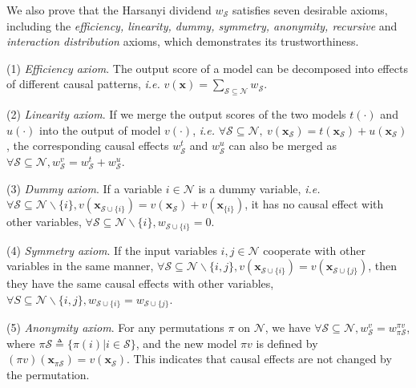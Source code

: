 We also prove that the Harsanyi dividend {\small$w_{\mathcal{S}}$} satisfies seven desirable axioms, including the \textit{efficiency, linearity, dummy, symmetry, anonymity, recursive} and \textit{interaction distribution} axioms, which demonstrates its trustworthiness.

(1) \textit{Efficiency axiom}. The output score of a model can be decomposed into effects of different causal patterns, \emph{i.e.} {\small $v(\boldsymbol{x})=\sum_{\mathcal{S}\subseteq\mathcal{N}}w_{\mathcal{S}}$}.

(2) \textit{Linearity axiom}. If we merge the output scores of the two models $t(\cdot)$ and $u(\cdot)$ into the output of model $v(\cdot)$, \emph{i.e.} {\small $\forall \mathcal{S}\subseteq\mathcal{N},~ v(\boldsymbol{x}_{\mathcal{S}})=t(\boldsymbol{x}_{\mathcal{S}})+u(\boldsymbol{x}_{\mathcal{S}})$}, the corresponding causal effects {\small $w^t_{\mathcal{S}}$} and {\small $w^u_{\mathcal{S}}$} can also be merged as {\small$\forall \mathcal{S}\subseteq \mathcal{N}, w^v_{\mathcal{S}}=w^t_{\mathcal{S}}+w^u_{\mathcal{S}}$}.

(3) \textit{Dummy axiom}. If a variable {\small $i\in\mathcal{N}$} is a dummy variable, \emph{i.e.} 
{\small $\forall \mathcal{S}\subseteq \mathcal{N}\backslash\{i\}, v(\boldsymbol{x}_{\mathcal{S}\cup\{i\}})=v(\boldsymbol{x}_{\mathcal{S}})+v(\boldsymbol{x}_{\{i\}})$}, it has no causal effect with other variables, {\small $\forall \mathcal{S}\subseteq \mathcal{N}\backslash\{i\}, w_{\mathcal{S}\cup\{i\}}=0$}.

(4) \textit{Symmetry axiom}. If the input variables {\small $i,j\in \mathcal{N}$} cooperate with other variables in the same manner, {\small $\forall \mathcal{S}\subseteq \mathcal{N}\backslash\{i,j\}, v(\boldsymbol{x}_{\mathcal{S}\cup\{i\}})=v(\boldsymbol{x}_{\mathcal{S}\cup\{j\}})$}, then they have the same causal effects with other variables, {\small $\forall S\subseteq \mathcal{N}\backslash\{i,j\}, w_{\mathcal{S}\cup\{i\}}=w_{\mathcal{S}\cup\{j\}}$}.

(5) \textit{Anonymity axiom}. For any permutations $\pi$ on {\small $\mathcal{N}$}, we have {\small $\forall \mathcal{S}
\!\subseteq\! \mathcal{N}, w^v_{\mathcal{S}}\!=\!w^{\pi v}_{\pi \mathcal{S}}$}, where {\small $\pi \mathcal{S} \!\triangleq\!\{\pi(i)|i\!\in\!\! \mathcal{S}\}$}, and the new model {\small $\pi v$} is defined by {\small $(\pi v)(\boldsymbol{x}_{\pi\mathcal{S}})\!=\!v(\boldsymbol{x}_{\mathcal{S}})$}.
This indicates that causal effects are not changed by the permutation.

